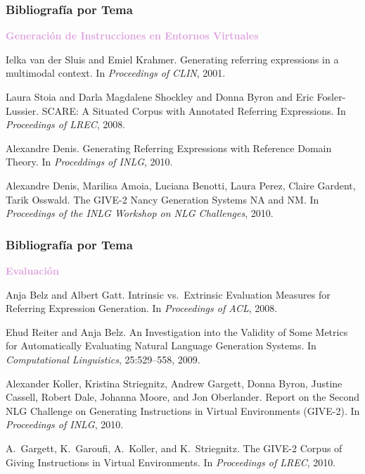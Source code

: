 \documentclass[compress,color=usenames]{beamer}
\newcommand{\mH}[1]{\textcolor{Plum}{#1}}
\begin{document}
\begin{frame}
\frametitle{Bibliograf\'ia por Tema}

\mH{\bf Generaci\'on de Instrucciones en Entornos Virtuales}
\medskip

\begin{thebibliography}{10}\small

 Ielka van der Sluis and Emiel Krahmer.
\newblock Generating referring expressions in a multimodal context.
\newblock In \emph{Proceedings of CLIN}, 2001.

 Laura Stoia and Darla Magdalene Shockley and Donna Byron and Eric Fosler-Lussier.
\newblock SCARE: A Situated Corpus with Annotated Referring Expressions.
\newblock In \emph{Proceedings of LREC}, 2008.
  
 Alexandre Denis.
\newblock Generating Referring Expressions with Reference
Domain Theory.
\newblock In \emph{Proceddings of INLG}, 2010.

 Alexandre Denis, Marilisa Amoia, Luciana Benotti, Laura Perez,
Claire Gardent, Tarik Osswald.
\newblock The GIVE-2 Nancy Generation Systems NA and NM.
\newblock In \emph{Proceedings of the INLG Workshop on NLG Challenges}, 2010.



\end{thebibliography}
\end{frame}

\frametitle{Bibliograf\'ia por Tema}
\begin{frame}

\mH{\bf Evaluaci\'on}
\medskip

\begin{thebibliography}{10}\small

 Anja Belz and Albert Gatt.
\newblock Intrinsic vs.\ Extrinsic Evaluation Measures for Referring Expression   Generation.
\newblock In \emph{Proceedings of ACL}, 2008.

 Ehud Reiter and Anja Belz.
\newblock An Investigation into the Validity of Some
Metrics for Automatically Evaluating Natural Language Generation
Systems.
\newblock In \emph{Computational Linguistics}, 25:529--558, 2009.
  
 Alexander Koller, Kristina Striegnitz, Andrew Gargett, Donna Byron,
Justine Cassell, Robert Dale, Johanna Moore, and Jon Oberlander.
\newblock Report on the Second NLG Challenge on Generating Instructions in
Virtual Environments (GIVE-2).
\newblock In \emph{Proceedings of INLG}, 2010.

 A.\ Gargett, K.\ Garoufi, A.\ Koller, and K.\
Striegnitz.
\newblock The GIVE-2 Corpus of Giving Instructions in Virtual
Environments.
\newblock In \emph{Proceedings of LREC}, 2010.


\end{thebibliography}
\end{frame}
\end{document}
